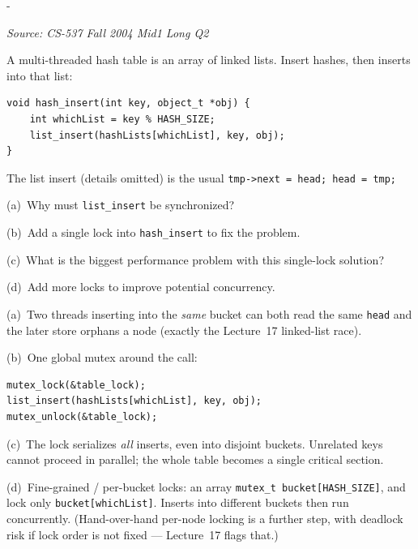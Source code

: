 \documentclass[11pt,a4paper]{article}
\makeatletter
\newcommand{\keepspace}[1]{\par\penalty-100\begingroup
  \setlength{\dimen@}{#1}\dimen@ii\pagegoal\advance\dimen@ii-\pagetotal
  \ifdim\dimen@>\dimen@ii\ifdim\dimen@ii>\z@\vfil\fi\break\fi\endgroup}
\newcounter{qn}[section]
\newenvironment{Qn}[4]{%
  \refstepcounter{qn}\keepspace{7\baselineskip}%
  \begin{tcolorbox}[qboxstyle, title={Q\thesection.\theqn\ \ [#1 \textbar\ #2]\ \ #4}]%
  {\footnotesize\color{g3}\textit{Source: #3}}\par\smallskip%
}{%
  \end{tcolorbox}%
}
\newenvironment{Sol}{%
  \begin{tcolorbox}[sboxstyle, title={Solution}]%
}{%
  \end{tcolorbox}\vspace{0.35em}%
}
\makeatother
\begin{document}
\begin{Qn}{Medium-Hard}{Lect 17}{CS-537 Fall 2004 Mid1 Long Q2}{Hash table: why lock, one lock, then many locks}
A multi-threaded hash table is an array of linked lists. Insert hashes, then inserts into that list:

\begin{lstlisting}[numbers=none]
void hash_insert(int key, object_t *obj) {
    int whichList = key % HASH_SIZE;
    list_insert(hashLists[whichList], key, obj);
}
\end{lstlisting}

The list insert (details omitted) is the usual
\texttt{tmp->next = head; head = tmp;}

(a)~Why must \texttt{list\_insert} be synchronized?

(b)~Add a single lock into \texttt{hash\_insert} to fix the problem.

(c)~What is the biggest performance problem with this single-lock solution?

(d)~Add more locks to improve potential concurrency.
\end{Qn}
\begin{Sol}
(a)~Two threads inserting into the \emph{same} bucket can both read the same \texttt{head} and the later store orphans a node (exactly the Lecture~17 linked-list race).

(b)~One global mutex around the call:
\begin{lstlisting}[numbers=none]
mutex_lock(&table_lock);
list_insert(hashLists[whichList], key, obj);
mutex_unlock(&table_lock);
\end{lstlisting}

(c)~The lock serializes \emph{all} inserts, even into disjoint buckets. Unrelated keys cannot proceed in parallel; the whole table becomes a single critical section.

(d)~Fine-grained / per-bucket locks: an array \texttt{mutex\_t bucket[HASH\_SIZE]}, and lock only \texttt{bucket[whichList]}. Inserts into different buckets then run concurrently. (Hand-over-hand per-node locking is a further step, with deadlock risk if lock order is not fixed --- Lecture~17 flags that.)
\end{Sol}
\end{document}

